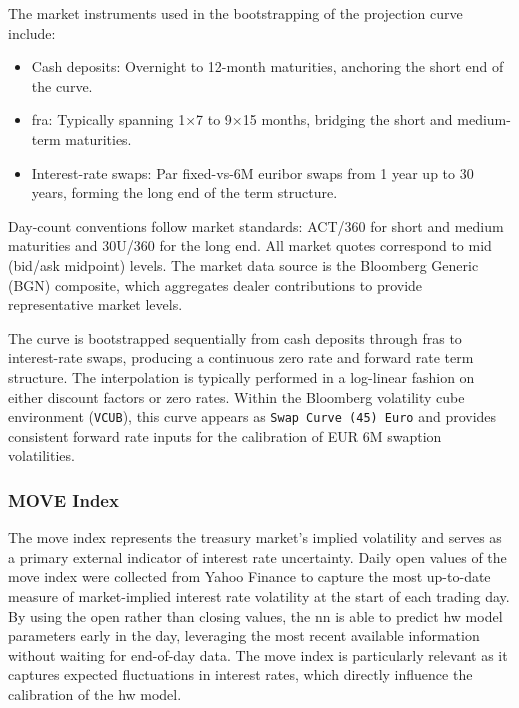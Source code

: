 The market instruments used in the bootstrapping of the projection curve include:
\begin{itemize}
	\item Cash deposits: Overnight to 12-month maturities, anchoring the short end of the curve.
	\item \ac{fra}: Typically spanning 1×7 to 9×15 months, bridging the short and medium-term maturities.
	\item Interest-rate swaps: Par fixed-vs-6M \ac{euribor} swaps from 1 year up to 30 years, forming the long end of the term structure.
\end{itemize}

Day-count conventions follow market standards: ACT/360 for short and medium maturities and 30U/360 for the long end. All market quotes correspond to mid (bid/ask midpoint) levels. The market data source is the Bloomberg Generic (BGN) composite, which aggregates dealer contributions to provide representative market levels.

The curve is bootstrapped sequentially from cash deposits through \ac{fra}s to interest-rate swaps, producing a continuous zero rate and forward rate term structure. The interpolation is typically performed in a log-linear fashion on either discount factors or zero rates. Within the Bloomberg volatility cube environment (\texttt{VCUB}), this curve appears as \texttt{Swap Curve (45) Euro} and provides consistent forward rate inputs for the calibration of EUR 6M swaption volatilities.

\subsubsection{MOVE Index}
The \ac{move} index represents the treasury market's implied volatility and serves as a primary external indicator of interest rate uncertainty. Daily open values of the \ac{move} index were collected from Yahoo Finance to capture the most up-to-date measure of market-implied interest rate volatility at the start of each trading day. By using the open rather than closing values, the \ac{nn} is able to predict \ac{hw} model parameters early in the day, leveraging the most recent available information without waiting for end-of-day data. The \ac{move} index is particularly relevant as it captures expected fluctuations in interest rates, which directly influence the calibration of the \ac{hw} model.

